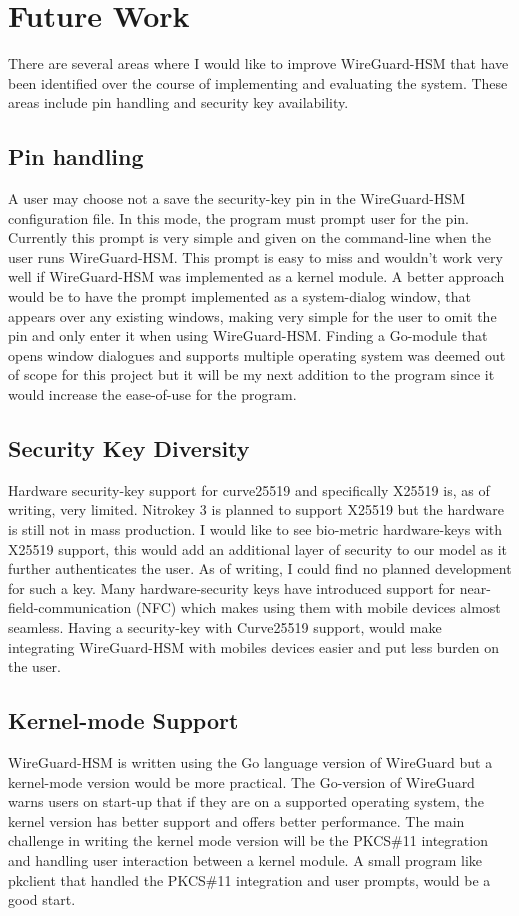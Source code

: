 \documentclass [11pt, proquest] {uwthesis}[2020/02/24]
\begin{document}
\section {Future Work}
There are several areas where I would like to improve WireGuard-HSM that have been identified over the course of implementing and evaluating the system. These areas include pin handling and security key availability. 

\subsection{Pin handling}
 A user may choose not a save the security-key pin in the WireGuard-HSM configuration file. In this mode, the program must prompt user for the pin. Currently this prompt is very simple and given on the command-line when the user runs WireGuard-HSM. This prompt is easy to miss and wouldn't work very well if WireGuard-HSM was implemented as a kernel module. A better approach would be to have the prompt implemented as a system-dialog window, that appears over any existing windows, making very simple for the user to omit the pin and only enter it when using WireGuard-HSM. Finding a Go-module that opens window dialogues and supports multiple operating system was deemed out of scope for this project but it will be my next addition to the program since it would increase the ease-of-use for the program. 
 
\subsection{Security Key Diversity}
Hardware security-key support for curve25519 and specifically X25519 is, as of writing, very limited. Nitrokey 3 is planned to support X25519 but the hardware is still not in mass production. I would like to see bio-metric hardware-keys with X25519 support, this would add an additional layer of security to our model as it further authenticates the user. As of writing, I could find no planned development for such a key. Many hardware-security keys have introduced support for near-field-communication (NFC) which makes using them with mobile devices almost seamless. Having a security-key with Curve25519 support, would make integrating WireGuard-HSM with mobiles devices easier and put less burden on the user. 

\subsection{Kernel-mode Support}
WireGuard-HSM is written using the Go language version of WireGuard but a kernel-mode version would be more practical. The Go-version of WireGuard warns users on start-up that if they are on a supported operating system, the kernel version has better support and offers better performance. The main challenge in writing the kernel mode version will be the PKCS\#11 integration and handling user interaction between a kernel module. A small program like pkclient that handled the PKCS\#11 integration and user prompts, would be a good start. 
\end{document}
